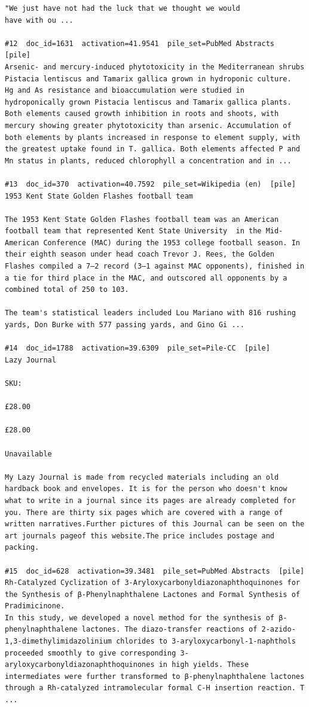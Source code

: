 \begin{verbatim}
"We just have not had the luck that we thought we would
have with ou ...

#12  doc_id=1631  activation=41.9541  pile_set=PubMed Abstracts  [pile]
Arsenic- and mercury-induced phytotoxicity in the Mediterranean shrubs Pistacia lentiscus and Tamarix gallica grown in hydroponic culture.
Hg and As resistance and bioaccumulation were studied in hydroponically grown Pistacia lentiscus and Tamarix gallica plants. Both elements caused growth inhibition in roots and shoots, with mercury showing greater phytotoxicity than arsenic. Accumulation of both elements by plants increased in response to element supply, with the greatest uptake found in T. gallica. Both elements affected P and Mn status in plants, reduced chlorophyll a concentration and in ...

#13  doc_id=370  activation=40.7592  pile_set=Wikipedia (en)  [pile]
1953 Kent State Golden Flashes football team

The 1953 Kent State Golden Flashes football team was an American football team that represented Kent State University  in the Mid-American Conference (MAC) during the 1953 college football season. In their eighth season under head coach Trevor J. Rees, the Golden Flashes compiled a 7–2 record (3–1 against MAC opponents), finished in a tie for third place in the MAC, and outscored all opponents by a combined total of 250 to 103.

The team's statistical leaders included Lou Mariano with 816 rushing yards, Don Burke with 577 passing yards, and Gino Gi ...

#14  doc_id=1788  activation=39.6309  pile_set=Pile-CC  [pile]
Lazy Journal

SKU:

£28.00

£28.00

Unavailable

My Lazy Journal is made from recycled materials including an old hardback book and envelopes. It is for the person who doesn't know what to write in a journal since its pages are already completed for you. There are thirty six pages which are covered with a range of written narratives.Further pictures of this Journal can be seen on the art journals pageof this website.The price includes postage and packing.

#15  doc_id=628  activation=39.3481  pile_set=PubMed Abstracts  [pile]
Rh-Catalyzed Cyclization of 3-Aryloxycarbonyldiazonaphthoquinones for the Synthesis of β-Phenylnaphthalene Lactones and Formal Synthesis of Pradimicinone.
In this study, we developed a novel method for the synthesis of β-phenylnaphthalene lactones. The diazo-transfer reactions of 2-azido-1,3-dimethylimidazolinium chlorides to 3-aryloxycarbonyl-1-naphthols proceeded smoothly to give corresponding 3-aryloxycarbonyldiazonaphthoquinones in high yields. These intermediates were further transformed to β-phenylnaphthalene lactones through a Rh-catalyzed intramolecular formal C-H insertion reaction. T ...


\end{verbatim}
